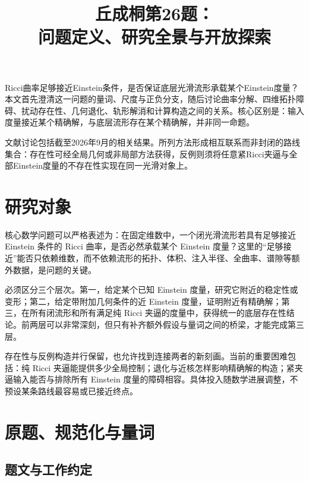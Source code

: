 \documentclass[11pt,a4paper]{article}
\title{丘成桐第26题：\\问题定义、研究全景与开放探索}
\author{}\date{}
\theoremstyle{definition}
\begin{document}
\maketitle
\vspace{-2em}

Ricci曲率足够接近Einstein条件，是否保证底层光滑流形承载某个Einstein度量？本文首先澄清这一问题的量词、尺度与正负分支，随后讨论曲率分解、四维拓扑障碍、扰动存在性、几何退化、轨形解消和计算构造之间的关系。核心区别是：输入度量接近某个精确解，与底层流形存在某个精确解，并非同一命题。

文献讨论包括截至2026年9月的相关结果。所列方法形成相互联系而非封闭的路线集合：存在性可经全局几何或非局部方法获得，反例则须将任意紧Ricci夹逼与全部Einstein度量的不存在性实现在同一光滑对象上。

\tableofcontents
\newpage

\section{研究对象}

核心数学问题可以严格表述为：在固定维数中，一个闭光滑流形若具有足够接近 Einstein 条件的 Ricci 曲率，是否必然承载某个 Einstein 度量？这里的“足够接近”能否只依赖维数，而不依赖流形的拓扑、体积、注入半径、全曲率、谱隙等额外数据，是问题的关键。

必须区分三个层次。第一，给定某个已知 Einstein 度量，研究它附近的稳定性或变形；第二，给定带附加几何条件的近 Einstein 度量，证明附近有精确解；第三，在所有闭流形和所有满足纯 Ricci 夹逼的度量中，获得统一的底层存在性结论。前两层可以非常深刻，但只有补齐额外假设与量词之间的桥梁，才能完成第三层。

存在性与反例构造并行保留，也允许找到连接两者的新刻画。当前的重要困难包括：纯 Ricci 夹逼能提供多少全局控制；退化与近核怎样影响精确解的构造；紧夹逼输入能否与排除所有 Einstein 度量的障碍相容。具体投入随数学进展调整，不预设某条路线最容易或已接近终点。

\section{原题、规范化与量词}\label{sec:definition}

\subsection{题文与工作约定}
\end{document}
